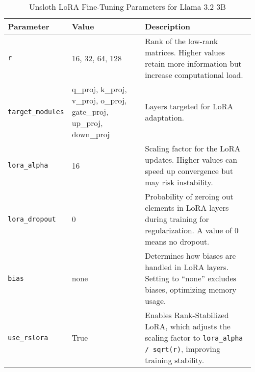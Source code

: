 \begin{table}[t]
    \centering
    \caption{Unsloth LoRA Fine-Tuning Parameters for Llama 3.2 3B}
    \label{tab:lora-parameters}
    \begin{tabular}{l p{2cm} p{8.2cm}}
    \toprule
    \textbf{Parameter} & \textbf{Value} & \textbf{Description} \\
    \midrule
    \texttt{r} & 16, 32, 64, 128 & Rank of the low-rank matrices. Higher values retain more information but increase computational load. \\
    \addlinespace[3pt]
    \texttt{target\_modules} & q\_proj, k\_proj, v\_proj, o\_proj, gate\_proj, up\_proj, down\_proj &
    Layers targeted for LoRA adaptation. \\
    \addlinespace[3pt]
    \texttt{lora\_alpha} & 16 & Scaling factor for the LoRA updates. Higher values can speed up convergence but may risk instability. \\
    \addlinespace[3pt]
    \texttt{lora\_dropout} & 0 & Probability of zeroing out elements in LoRA layers during training for regularization. A value of 0 means no dropout. \\
    \addlinespace[3pt]
    \texttt{bias} & none & Determines how biases are handled in LoRA layers. Setting to ``none'' excludes biases, optimizing memory usage. \\
    \addlinespace[3pt]
    \texttt{use\_rslora} & True & Enables Rank-Stabilized LoRA, which adjusts the scaling factor to \texttt{lora\_alpha / sqrt(r)}, improving training stability. \\
    \bottomrule
    \end{tabular}
 \end{table}
